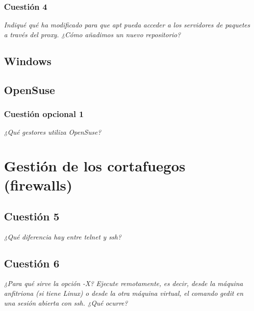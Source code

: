 \subsubsection{Cuestión 4}
\textit{Indiqué qué ha modificado para que apt pueda acceder a los servidores de paquetes a través del proxy. ¿Cómo añadimos un nuevo repositorio?}



\subsection{Windows}

\subsection{OpenSuse}
\subsubsection{Cuestión opcional 1}
\textit{¿Qué gestores utiliza OpenSuse?}



\section{Gestión de los cortafuegos (firewalls)}
\subsection{Cuestión 5}
\textit{¿Qué diferencia hay entre telnet y ssh?}

\subsection{Cuestión 6}
\textit{¿Para qué sirve la opción -X? Ejecute remotamente, es decir, desde la máquina anfitriona (si tiene Linux) o desde la otra máquina virtual, el comando gedit en una sesión abierta con ssh. ¿Qué ocurre?}

